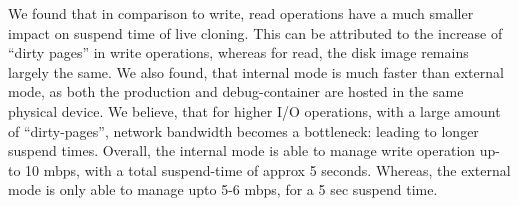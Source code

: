 We found that in comparison to write, read operations have a much smaller impact on suspend time of live cloning.
This can be attributed to the increase of ``dirty pages'' in write operations, whereas for read, the disk image remains largely the same.
We also found, that internal mode is much faster than external mode, as both the production and debug-container are hosted in the same physical device.
We believe, that for higher I/O operations, with a large amount of ``dirty-pages'', network bandwidth becomes a bottleneck: leading to longer suspend times.
Overall, the internal mode is able to manage write operation up-to 10 mbps, with a total suspend-time of approx 5 seconds.
Whereas, the external mode is only able to manage upto 5-6 mbps, for a 5 sec suspend time.

